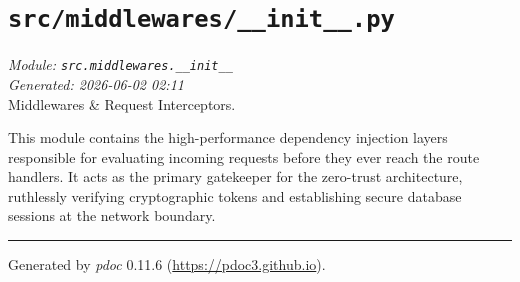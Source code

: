 
\section{\texttt{src/middlewares/\_\_init\_\_.py}}
\textit{Module: \texttt{src.middlewares.\_\_init\_\_}} \\
\textit{Generated: 2026-06-02 02:11} \\

Middlewares \& Request Interceptors.

This module contains the high-performance dependency injection layers
responsible for evaluating incoming requests before they ever reach the
route handlers. It acts as the primary gatekeeper for the zero-trust
architecture, ruthlessly verifying cryptographic tokens and establishing
secure database sessions at the network boundary.

\begin{center}\rule{0.5\linewidth}{0.5pt}
\end{center}

Generated by \emph{pdoc} 0.11.6 (\url{https://pdoc3.github.io}).
